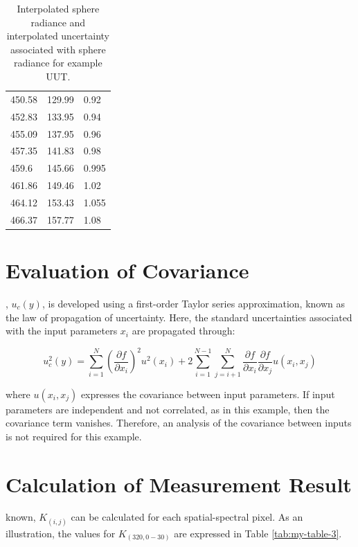 \documentclass[nohyper,nobib]{tufte-book}
\begin{document}
\begin{table}[]
\begin{tabular}{@{}lll@{}}
450.58          & 129.99            & 0.92              \\
452.83          & 133.95            & 0.94              \\
455.09          & 137.95            & 0.96              \\
457.35          & 141.83            & 0.98              \\
459.6           & 145.66            & 0.995             \\
461.86          & 149.46            & 1.02              \\
464.12          & 153.43            & 1.055             \\
466.37          & 157.77            & 1.08              \\ \bottomrule
\end{tabular}
\caption{Interpolated sphere radiance and interpolated uncertainty associated with sphere radiance for example UUT.}
\label{tab:my-table-2}
\end{table}


\section{Evaluation of Covariance}
, $u_{c}(y)$, is developed using a first-order Taylor series approximation, known as the law of propagation of uncertainty. Here, the standard uncertainties associated with the input parameters $x_{i}$ are propagated through:

\begin{equation}
u_c^2(y)=  \sum_{i=1}^N\left(\frac{\partial f}{\partial x_i}\right)^2 u^2\left(x_i\right) +2 \sum_{i=1}^{N-1} \sum_{j=i+1}^N \frac{\partial f}{\partial x_i} \frac{\partial f}{\partial x_j} u\left(x_i, x_j\right)
\end{equation}

where $ u\left(x_i, x_j\right)$  expresses the covariance between input parameters. If input parameters are independent and not correlated, as in this example, then the covariance term vanishes. Therefore, an analysis of the covariance between inputs is not required for this example. 

\section{Calculation of Measurement Result}

 known, $K_{(i, j)}$ can be calculated for each spatial-spectral pixel. As an illustration, the values for $K_{(320, 0 -30)}$ are expressed in Table \ref{tab:my-table-3}.
\end{document}

